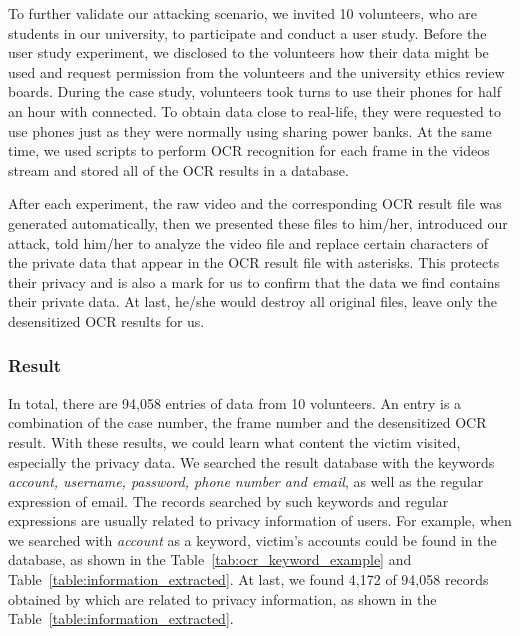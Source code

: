 
\iffalse

To further validate our attacking scenario, we invited 10 volunteers, who are students in our university, to participate and conduct a user study.
Before the user study experiment, we disclosed to the volunteers how their data might be used and request permission from the volunteers and the university ethics review boards.
During the case study, volunteers took turns to use their phones for half an hour with \tool connected.
To obtain data close to real-life, they were requested to use phones just as they were normally using sharing power banks.
At the same time, we used scripts to perform \ac{OCR} recognition for each frame in the videos stream and stored all of the \ac{OCR} results in a database.

After each experiment, the raw video and the corresponding \ac{OCR} result file was generated automatically, then we presented these files to him/her, introduced our attack, told him/her to analyze the video file and replace certain characters of the private data that appear in the \ac{OCR} result file with asterisks. This protects their privacy and is also a mark for us to confirm that the data we find contains their private data. At last, he/she would destroy all original files, leave only the desensitized \ac{OCR} results for us.


\subsubsection{Result}

In total, there are 94,058 entries of data from 10 volunteers. An entry is a combination of the case number, the frame number and the desensitized \ac{OCR} result.
With these results, we could learn what content the victim visited, especially the privacy data.
We searched the result database with the keywords \textit{account, username, password, phone number and email}, as well as the regular expression of email.
The records searched by such keywords and regular expressions are usually related to privacy information of users.
For example, when we searched with \textit{account} as a keyword, victim's accounts could be found in the database, as shown in the Table~\ref{tab:ocr_keyword_example} and Table~\ref{table:information_extracted}.
At last, we found 4,172 of 94,058 records obtained by \tool which are related to privacy information, as shown in the Table~\ref{table:information_extracted}.

